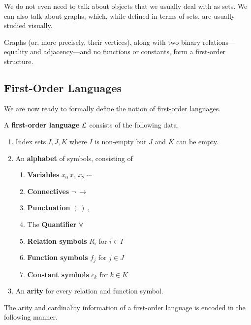We do not even need to talk about objects that we usually deal with as sets. We can also talk about graphs, which, while defined in terms of sets, are usually studied visually.
\begin{boxexample}[Graphs]
    Graphs (or, more precisely, their vertices), along with two binary relations---equality and adjacency---and no functions or constants, form a first-order structure.
\end{boxexample}

\subsection{First-Order Languages}

We are now ready to formally define the notion of first-order languages.

\begin{boxdefinition}\label{Ch2:Def:First-Order_Language}
    A \textbf{first-order language} $\mathcal{L}$ consists of the following data.
    \begin{enumerate}
        \item Index sets $I, J, K$ where $I$ is non-empty but $J$ and $K$ can be empty.
        \item An \textbf{alphabet} of symbols, consisting of
        \begin{enumerate}[noitemsep]
            \item \textbf{Variables} $x_0 \ x_1 \ x_2 \ \cdots$
            \item \textbf{Connectives} $\neg \ \to$
            \item \textbf{Punctuation} $( \ ) \ ,$
            \item The \textbf{Quantifier} $\forall$
            \item \textbf{Relation symbols} $R_i$ for $i \in I$
            \item \textbf{Function symbols} $f_j$ for $j \in J$
            \item \textbf{Constant symbols} $c_k$ for $k \in K$
        \end{enumerate}
        \item An \textbf{arity} for every relation and function symbol.
    \end{enumerate}
\end{boxdefinition}

The arity and cardinality information of a first-order language is encoded in the following manner.

